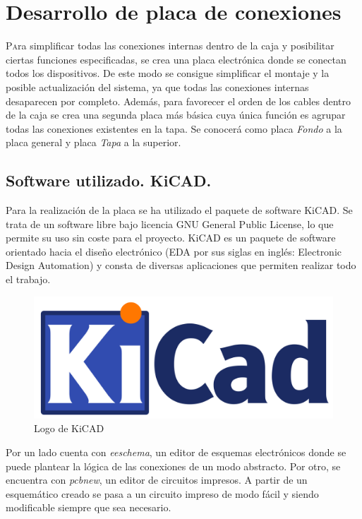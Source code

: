 \chapter{Desarrollo de placa de conexiones}\label{chp-03}

\lettrine[lraise=-0.1, lines=2, loversize=0.2]{P}ara simplificar todas las conexiones internas
dentro de la caja y posibilitar ciertas funciones especificadas, se crea una placa electrónica
donde se conectan todos los dispositivos. De este modo se consigue simplificar el montaje y la
posible actualización del sistema, ya que todas las conexiones internas desaparecen por completo.
Además, para favorecer el orden de los cables dentro de la caja se crea una segunda placa más básica
cuya única función es agrupar todas las conexiones existentes en la tapa. Se conocerá como placa \textit{Fondo}
a la placa general y placa \textit{Tapa} a la superior.

\section{Software utilizado. KiCAD.}

Para la realización de la placa se ha utilizado el paquete de software KiCAD. Se trata de un software 
libre bajo licencia GNU General Public License, lo que permite su uso sin coste para el proyecto. KiCAD
es un paquete de software orientado hacia el diseño electrónico (EDA por sus siglas en inglés: Electronic
Design Automation) y consta de diversas aplicaciones que permiten realizar todo el trabajo.

\begin{figure}[hbtp]
    \centering
    \includegraphics[width=\textwidth/2]{03-placa/01-KiCad-Logo.png}
    \caption{Logo de KiCAD}
    \label{fig:figura31logo}
    \end{figure}

Por un lado cuenta con \textit{eeschema}, un editor de esquemas electrónicos donde se puede plantear
la lógica de las conexiones de un modo abstracto. Por otro, se encuentra con \textit{pcbnew}, un editor
de circuitos impresos. A partir de un esquemático creado se pasa a un circuito impreso de modo fácil y
siendo modificable siempre que sea necesario.

